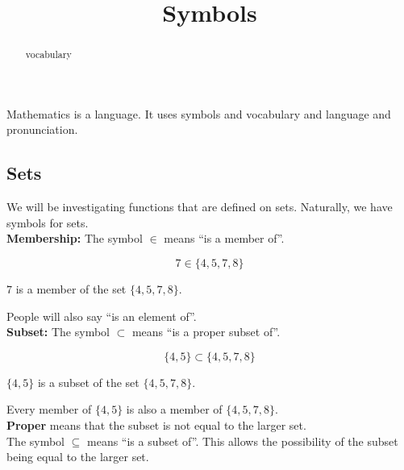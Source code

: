 \documentclass{ximera}
\title{Symbols}
\begin{document}
\begin{abstract}
vocabulary
\end{abstract}
\maketitle




Mathematics is a language.  It uses symbols and vocabulary and language and pronunciation. \\




\subsection{Sets}



We will be investigating functions that are defined on sets. Naturally, we have symbols for sets. \\



\textbf{\textcolor{blue!55!black}{Membership:}}  The symbol $\in$ means ``is a member of''.


\[
7 \in \{ 4, 5, 7, 8 \}
\]

\begin{center}

$7$ is a member of the set $\{ 4, 5, 7, 8 \}$.

\end{center}

People will also say ``is an element of''. \\





\textbf{\textcolor{blue!55!black}{Subset:}}  The symbol $\subset$ means ``is a proper subset of''.


\[
\{ 4, 5 \} \subset \{ 4, 5, 7, 8 \}
\]

\begin{center}

$\{ 4, 5 \}$ is a subset of the set $\{ 4, 5, 7, 8 \}$.

\end{center}


Every member of $\{ 4, 5 \}$ is also a member of $\{ 4, 5, 7, 8 \}$. \\


\textbf{Proper} means that the subset is not equal to the larger set. \\


The symbol $\subseteq$ means ``is a subset of''.  This allows the possibility of the subset being equal to the larger set.
\end{document}
